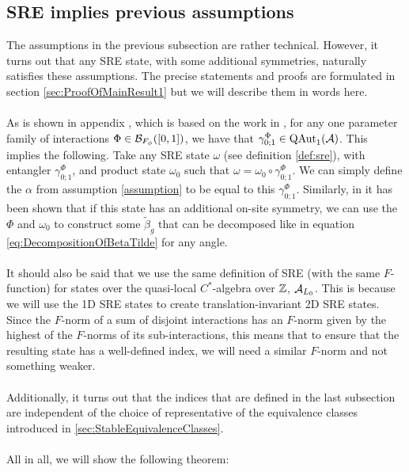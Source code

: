 \documentclass[11pt,a4paper,twoside]{article}
\def\version{1}
\newcommand{\versionDifference}[2]{\ifthenelse{\version=0}{#1}{#2}}
\numberwithin{equation}{section}
\begin{document}
	\subsection{SRE implies previous assumptions}\label{sec:Results_1}
	The assumptions in the previous subsection are rather technical. However, it turns out that any SRE state, with some additional symmetries, naturally satisfies these assumptions. The precise statements and proofs are formulated in section \ref{sec:ProofOfMainResult1} but we will describe them in words here.
	\\\\
	As is shown in appendix \versionDifference{\ref{sec:properties-of-locally-generated-automorphisms-2d}}{C of \cite{jappens2023spt}}, which is based on the work in \cite{ogata2021h3gmathbb}, for any one parameter family of interactions $\Phi\in\BB_{F_\phi}([0,1])$, we have that $\gamma^\Phi_{0;1}\in\QAut{\AA}$. This implies the following. Take any SRE state $\omega$ (see definition \ref{def:sre}), with entangler $\gamma^\Phi_{0;1}$, and product state $\omega_0$ such that $\omega=\omega_0\circ \gamma^\Phi_{0;1}$. We can simply define the $\alpha$ from assumption \ref{assumption} to be equal to this $\gamma^\Phi_{0;1}$. Similarly, in \cite{ogata2021h3gmathbb} it has been shown that if this state has an additional on-site symmetry, we can use the $\Phi$ and $\omega_0$ to construct some $\tilde\beta_g$ that can be decomposed like in equation \eqref{eq:DecompositionOfBetaTilde} for any angle.
	\\\\
	It should also be said that we use the same definition of SRE (with the same $F$-function) for states over the quasi-local $C^*$-algebra over $\ZZ$, $\AA_{L_0}$. This is because we will use the 1D SRE states to create translation-invariant 2D SRE states. Since the $F$-norm of a sum of disjoint interactions has an $F$-norm given by the highest of the $F$-norms of its sub-interactions, this means that to ensure that the resulting state has a well-defined index, we will need a similar $F$-norm and not something weaker.
	\\\\
	Additionally, it turns out that the indices that are defined in the last subsection are independent of the choice of representative of the equivalence classes introduced in \ref{sec:StableEquivalenceClasses}.
	\\\\
	All in all, we will show the following theorem:
\end{document}
